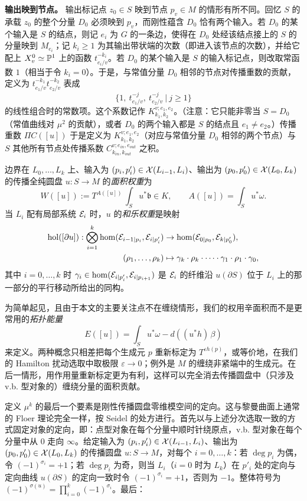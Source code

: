 \smallskip
\noindent\textbf{输出映到节点。}
输出标记点 $z_0\in S$ 映到节点 $p_v\in M$ 的情形有所不同。回忆 $S$ 的承载 $z_0$ 的整个分量 $D_0$ 必须映到 $p_v$，而刚性蕴含 $D_0$ 恰有两个输入。若 $D_0$ 的某个输入是 $S$ 的结点，则记 $e_i$ 为 $G$ 的一条边，使得在 $D_0$ 处经该结点接上的 $S$ 的分量映到 $M_{e_i}$；记 $k_i\geq 1$ 为其输出带状端的次数（即进入该节点的次数），并给它配上 $X^0_v\simeq\mathbb{P}^1$ 上的函数 $t_{e_i/v}^{-k_i}$。若 $D_0$ 的某个输入是 $S$ 的输入标记点，则改取常函数 $1$（相当于令 $k_i=0$）。于是，与常值分量 $D_0$ 相邻的节点对传播重数的贡献，定义为 $t_{e_1/v}^{-k_1}t_{e_2/v}^{-k_2}$ 表成
\[
\{1,\ t_{e_1/v}^{-j},\ t_{e_2/v}^{-j}\ |\ j\geq 1\}
\]
的线性组合时的常数项。这个系数记作 $K^{v;e_1,e_2}_{k_1,k_2}$。（注意：它只能非零当 $S=D_0$（常值曲线对 $\mu^2$ 的贡献），或者 $D_0$ 的两个输入都是 $S$ 的结点且 $e_1\neq e_2$。）传播重数 $\Pi C([u])$ 于是定义为 $K^{v;e_1,e_2}_{k_1,k_2}$（对应与常值分量 $D_0$ 相邻的两个节点）与 $S$ 其他所有节点处传播系数 $C^{v;e_{in},e_{out}}_{k_{in},k_{out}}$ 之积。

\begin{defi}\label{def:areaweight}
边界在 $L_0,\dots,L_k$ 上、输入为 $(p_i,p'_i)\in\mathcal{X}(L_{i-1},L_i)$、输出为 $(p_0,p'_0)\in\mathcal{X}(L_0,L_k)$ 的传播全纯圆盘 $u:S\to M$ 的\emph{面积权重}为
\[
W([u]):=T^{A([u])}\,\int_S u^*\mathfrak{b}\in K,\qquad A([u])=\int_S u^*\omega .
\]
当 $L_i$ 配有局部系统 $\mathcal{E}_i$ 时，$u$ 的\emph{和乐权重}是映射
\begin{align*}
\mathrm{hol}([\partial u]):\bigotimes_{i=1}^k \hom(\mathcal{E}_{i-1|p_i},\mathcal{E}_{i|p'_i})&\to \hom(\mathcal{E}_{0|p_0},\mathcal{E}_{k|p'_0}),\\
(\rho_1,\dots,\rho_k)&\mapsto \gamma_k\cdot \rho_k\cdot\dots\cdot\gamma_1\cdot\rho_1\cdot\gamma_0,
\end{align*}
其中 $i=0,\dots,k$ 时 $\gamma_i\in\hom(\mathcal{E}_{i|p'_i},\mathcal{E}_{i|p_{i+1}})$ 是 $\mathcal{E}_i$ 的纤维沿 $u(\partial S)$ 位于 $L_i$ 上的那一部分的平行移动所给出的同构。
\end{defi}

为简单起见，且由于本文的主要关注点不在缠绕情形，我们的权用辛面积而不是更常用的\emph{拓扑能量}
\[
E([u])=\int_S u^*\omega-d((u^*h)\,\beta)
\]
来定义。两种概念只相差把每个生成元 $p$ 重新标定为 $T^{\varepsilon h(p)}$，或等价地，在我们的 Hamilton 扰动选取中取极限 $\varepsilon\to 0$；例外是 $M$ 的缠绕非紧端中的生成元。在后一情形，用作用量重新标定更为有利，这样可以完全消去传播圆盘中（只涉及 v.b. 型对象的）缠绕分量的面积贡献。

定义 $\mu^k$ 的最后一个要素是刚性传播圆盘零维模空间的定向。这与黎曼曲面上通常的 Floer 理论完全一样，按 Seidel \cite[\S13]{SeBook} 的处方进行。首先以与上述分次选取一致的方式固定对象的定向，即：点型对象在每个分量中顺时针绕原点，v.b. 型对象在每个分量中从 $0$ 走向 $\infty$。给定输入为 $(p_i,p'_i)\in\mathcal{X}(L_{i-1},L_i)$、输出为 $(p_0,p'_0)\in\mathcal{X}(L_0,L_k)$ 的传播圆盘 $u:S\to M$，对每个 $i=0,\dots,k$：若 $\deg p_i$ 为偶，令 $(-1)^{\sigma_i}=+1$；若 $\deg p_i$ 为奇，则当 $L_i$（$i=0$ 时为 $L_k$）在 $p'_i$ 处的定向与定向曲线 $u(\partial S)$ 的定向一致时令 $(-1)^{\sigma_i}=+1$，否则为 $-1$。整体符号为 $(-1)^{\sigma(u)}=\prod_{i=0}^k (-1)^{\sigma_i}$。最后：

